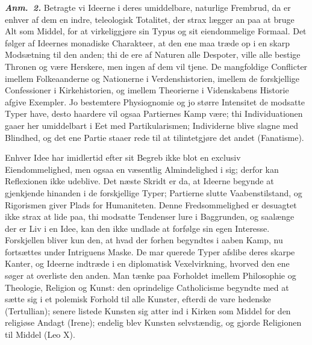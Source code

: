 \documentclass[12pt]{book}
\newcommand{\anm}[1]{\emph{\textbf{Anm.~#1.}}}
\newcommand{\opage}[1]{\marginnote{\footnotesize\textit{[#1]}}}
\begin{document}
\anm{2} Betragte vi Ideerne i deres umiddelbare, naturlige Frembrud, da er enhver af dem
en indre, teleologisk Totalitet, der strax lægger an paa at bruge Alt som Middel, for at
virkeliggjøre sin Typus og sit eiendommelige Formaal. Det følger af Ideernes monadiske
Charakteer, at den ene maa træde op i en skarp Modsætning til den anden; thi de ere af
Naturen alle Despoter, ville alle bestige Thronen og være Herskere, men ingen af dem vil
tjene. De mangfoldige Conflicter imellem Folkeaanderne og Nationerne i Verdenshistorien,
imellem de forskjellige Confessioner i Kirkehistorien, og imellem Theorierne i
Videnskabens Historie afgive Exempler. Jo bestemtere Physiognomie og jo større Intensitet
de modsatte Typer have, desto haardere vil ogsaa Partiernes Kamp være; thi Individuationen
gaaer her umiddelbart i Eet med Partikularismen; Individerne blive slagne med Blindhed,
og det ene Partie staaer rede til at tilintetgjøre det andet (Fanatisme).

Enhver Idee har imidlertid efter sit Begreb ikke blot en exclusiv Eiendommelighed, men
ogsaa en væsentlig Almindelighed i sig; derfor kan Reflexionen ikke udeblive. Det næste
Skridt er da, at Ideerne begynde at gjenkjende hinanden i de forskjellige Typer;
Partierne slutte Vaabenstilstand, og Rigorismen giver Plads for Humaniteten. Denne
Fredsommelighed er desuagtet ikke strax at lide paa, thi modsatte Tendenser lure i
Baggrunden, og saalænge der er Liv i en Idee, kan den ikke undlade at forfølge sin egen
Interesse. Forskjellen bliver kun den, at hvad der forhen begyndtes i aaben Kamp, nu
fortsættes under Intriguens Maske. De mar%
\opage{262}%
querede Typer afslibe deres skarpe Kanter, og Ideerne indtræde i en diplomatisk
Vexelvirkning, hvorved den ene søger at overliste den anden. Man tænke paa Forholdet
imellem Philosophie og Theologie, Religion og Kunst: den oprindelige Catholicisme
begyndte med at sætte sig i et polemisk Forhold til alle Kunster, efterdi de vare
hedenske (Tertullian); senere listede Kunsten sig atter ind i Kirken som Middel for den
religiøse Andagt (Irene); endelig blev Kunsten selvstændig, og gjorde Religionen til
Middel (Leo X).
\end{document}
